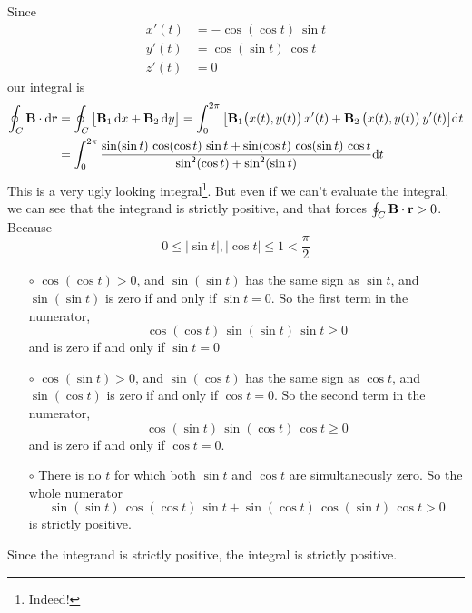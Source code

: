 \begin{eg}
\noindent
Since 
\begin{align*}
x'(t) &= -\cos(\cos t)\ \sin t \\
y'(t) &= \cos(\sin t)\ \cos t \\
z'(t) &= 0
\end{align*}
our integral is
\begin{align*}
\oint_C\mathbf{B}\cdot\mathrm{d}\mathbf{r}
&=\oint_C\big[\mathbf{B}_1\,\mathrm{d}x +\mathbf{B}_2\,\mathrm{d}y\big]
=\int_0^{2\pi}\big[\mathbf{B}_1\big(x(t),y(t)\big)\,x'(t) 
            +\mathbf{B}_2\,\big(x(t),y(t)\big)\,y'(t)\big]\mathrm{d}t
\\
&=\int_0^{2\pi}
            \frac{\sin(\sin t)\,\cos(\cos t)\,\sin t
                  +\sin(\cos t)\,\cos(\sin t)\,\cos t}
                  {\sin^2(\cos t) +\sin^2(\sin t)}
            \mathrm{d}t
\end{align*}
This is a very ugly looking integral\footnote{Indeed!}. 
But even if we can't evaluate the 
integral, we can see that the integrand is strictly positive,
and that forces $\oint_C\mathbf{B}\cdot\mathbf{r}>0$. Because
\begin{equation*}
0\le|\sin t|,|\cos t|\le 1<\frac{\pi}{2}
\end{equation*}
\begin{itemize}\itemsep1pt \parskip0pt  %
\item[$\circ$]
$\cos(\cos t)>0$, and $\sin(\sin t)$ has the same sign as $\sin t$,
and $\sin(\sin t)$ is zero if and only if $\sin t=0$. 
So the first term in the numerator,
\begin{equation*}
\cos(\cos t)\,\sin(\sin t)\,\sin t\ge 0
\end{equation*} 
and is zero if and only if $\sin t=0$ 
\item[$\circ$]
$\cos(\sin t)>0$, and $\sin(\cos t)$ has the same sign as $\cos t$, and 
$\sin(\cos t)$ is zero if and only if $\cos t=0$. So the second term 
in the numerator,
\begin{equation*}
\cos(\sin t)\,\sin(\cos t)\,\cos t\ge 0
\end{equation*}
and is zero
if and only if $\cos t=0$. 
\item[$\circ$]
There is no $t$ for which both $\sin t$ and $\cos t$ are simultaneously
zero. So the whole numerator 
\begin{equation*}
\sin(\sin t)\,\cos(\cos t)\,\sin t
                  +\sin(\cos t)\,\cos(\sin t)\,\cos t>0
\end{equation*}
is strictly positive.
\end{itemize}
Since the integrand is strictly positive, the integral is strictly positive.


\end{eg}
